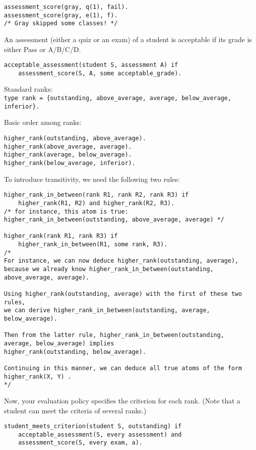 \documentclass[letterpaper,10pt]{article}
\begin{document}
\begin{flushleft}
\begin{verbatim}
assessment_score(gray, q(1), fail).
assessment_score(gray, e(1), f).
/* Gray skipped some classes! */
\end{verbatim}

An assessment (either a quiz or an exam) of a student is acceptable if its grade is either Pass or A/B/C/D.
\begin{verbatim}
acceptable_assessment(student S, assessment A) if
    assessment_score(S, A, some acceptable_grade).
\end{verbatim}

\pagebreak

Standard ranks:\\
\texttt{type rank = \{outstanding, above\_average, average, below\_average, inferior\}.}



Basic order among ranks:
\begin{verbatim}
higher_rank(outstanding, above_average).
higher_rank(above_average, average).
higher_rank(average, below_average).
higher_rank(below_average, inferior).
\end{verbatim}



To introduce transitivity, we need the following two rules:
\begin{verbatim}
higher_rank_in_between(rank R1, rank R2, rank R3) if
    higher_rank(R1, R2) and higher_rank(R2, R3).
/* for instance, this atom is true: higher_rank_in_between(outstanding, above_average, average) */

higher_rank(rank R1, rank R3) if
    higher_rank_in_between(R1, some rank, R3).
/* 
For instance, we can now deduce higher_rank(outstanding, average),
because we already know higher_rank_in_between(outstanding, above_average, average).

Using higher_rank(outstanding, average) with the first of these two rules, 
we can derive higher_rank_in_between(outstanding, average, below_average).

Then from the latter rule, higher_rank_in_between(outstanding, average, below_average) implies
higher_rank(outstanding, below_average).

Continuing in this manner, we can deduce all true atoms of the form higher_rank(X, Y) .
*/
\end{verbatim}

Now, your evaluation policy specifies the criterion for each rank. (Note that a student can meet the criteria of several ranks.)
\begin{verbatim}
student_meets_criterion(student S, outstanding) if
    acceptable_assessment(S, every assessment) and
    assessment_score(S, every exam, a).


\end{verbatim}
\end{flushleft}
\end{document}

